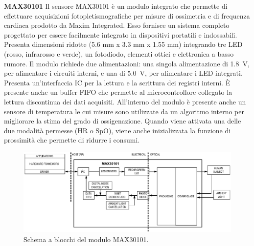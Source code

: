\textbf{MAX30101} Il sensore MAX30101 è un modulo integrato che permette di effettuare acquisizioni fotopletismografiche per misure di ossimetria e di frequenza cardiaca prodotto da Maxim Integrated\cite{IntegratedMAX30101}. Esso fornisce un sistema completo progettato per essere facilmente integrato in dispositivi portatili e indossabili. Presenta dimensioni ridotte (5.6 mm x 3.3 mm x 1.55 mm) integrando tre LED (rosso, infrarosso e verde), un fotodiodo, elementi ottici e elettronica a basso rumore. Il modulo richiede due alimentazioni: una singola alimentazione di \SI{1.8}{\volt}, per alimentare i circuiti interni, e una di \SI{5.0}{\volt}, per alimentare i LED integrati. Presenta un'interfaccia IC per la lettura e la scrittura dei registri interni. \`E presente anche un buffer FIFO che permette al microcontrollore collegato la lettura discontinua dei dati acquisiti. All'interno del modulo è presente anche un sensore di temperatura le cui misure sono utilizzate da un algoritmo interno per migliorare la stima del grado di ossigenazione. Quando viene attivata una delle due modalità permesse (HR o SpO), viene anche inizializzata la funzione di prossimità che permette di ridurre i consumi.   
\begin{figure}[tb]
	\centering
	\includegraphics[width=1\linewidth]{ImageFiles/Fotopletismografia/MAX30101BlockDiagram}
	\caption{Schema a blocchi del modulo MAX30101.}
	\label{fig:MAX30101BlockDiagram}
\end{figure}

\pagebreak

